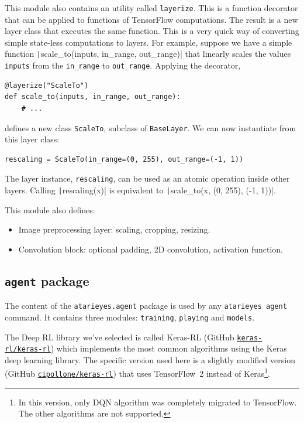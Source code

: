 This module also contains an utility called \texttt{layerize}. This is a
function decorator that can be applied to functions of TensorFlow
computations. The result is a new layer class that executes the same function.
This is a very quick way of converting simple state-less computations to
layers. For example, suppose we have a simple function
\texttt|scale_to(inputs, in_range, out_range)| that
linearly scales the values \texttt{inputs} from the \verb|in_range| to
\verb|out_range|. Applying the decorator,
\begin{verbatim}
@layerize("ScaleTo")
def scale_to(inputs, in_range, out_range):
	# ...
\end{verbatim}
defines a new class \texttt{ScaleTo}, subclass of \texttt{BaseLayer}. We can
now instantiate from this layer class:
\begin{verbatim}
rescaling = ScaleTo(in_range=(0, 255), out_range=(-1, 1))
\end{verbatim}
The layer instance, \texttt{rescaling}, can be used as an atomic operation
inside other layers. Calling \texttt|rescaling(x)| is
equivalent to \texttt|scale_to(x, (0, 255), (-1, 1))|.

This module also defines:
\begin{itemize}
	\item Image preprocessing layer: scaling, cropping, resizing.
	\item Convolution block: optional padding, 2D convolution, activation
		function.
\end{itemize}

\subsection{\texttt{agent} package}

\label{sec:impl-agent}

The content of the \verb|atarieyes.agent| package is used by any
\verb|atarieyes agent| command. It contains three modules: \texttt{training},
\texttt{playing} and \texttt{models}.

The Deep RL library we've selected is called Keras-RL (GitHub
\href{https://github.com/keras-rl/keras-rl}{\texttt{keras-rl/keras-rl}})
which implements the most common algorithms using the Keras deep learning
library. The specific version used here is a slightly modified version (GitHub
\href{https://github.com/cipollone/keras-rl}{\texttt{cipollone/keras-rl}})
that uses TensorFlow~2 instead of Keras\footnote{In this version, only DQN
algorithm was completely migrated to TensorFlow. The other algorithms are not
supported.}.


